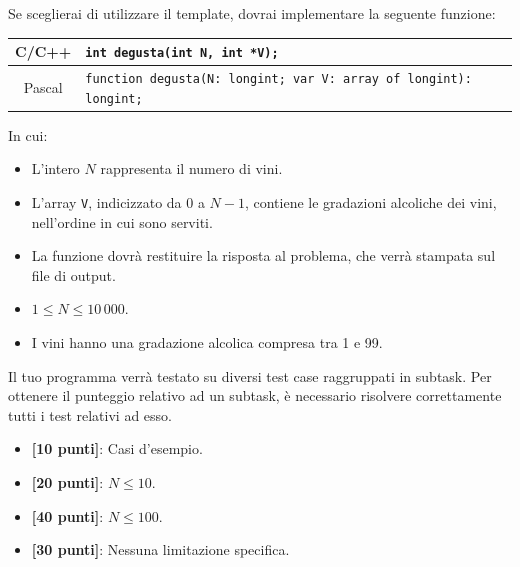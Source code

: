 Se sceglierai di utilizzare il template, dovrai implementare la seguente funzione:
\begin{center}\begin{tabularx}{\textwidth}{|c|X|}
\hline
C/C++  & \verb|int degusta(int N, int *V);|\\
\hline
Pascal & \verb|function degusta(N: longint; var V: array of longint): longint;|\\
\hline
\end{tabularx}\end{center}
In cui:
\begin{itemize}[nolistsep]
  \item L'intero $N$ rappresenta il numero di vini.
  \item L'array \texttt{V}, indicizzato da $0$ a $N-1$, contiene le gradazioni alcoliche dei vini, nell'ordine in cui sono serviti.
  \item La funzione dovrà restituire la risposta al problema, che verrà stampata sul file di output.
\end{itemize}

\Constraints
\begin{itemize}[nolistsep, itemsep=2mm]
\item $1 \le N \le 10\,000$.
\item I vini hanno una gradazione alcolica compresa tra 1 e 99.
\end{itemize}

\Scoring
Il tuo programma verrà testato su diversi test case raggruppati in subtask.
Per ottenere il punteggio relativo ad un subtask, è necessario risolvere
correttamente tutti i test relativi ad esso.

\begin{itemize}[nolistsep,itemsep=2mm]
  \item \textbf{ [10 punti]}: Casi d'esempio.
  \item \textbf{ [20 punti]}: $N \leq 10$.
  \item \textbf{ [40 punti]}: $N \leq 100$.
  \item \textbf{ [30 punti]}: Nessuna limitazione specifica.
\end{itemize}

\Examples
\begin{example}
%
\end{example}
\begin{example}
%
\end{example}


